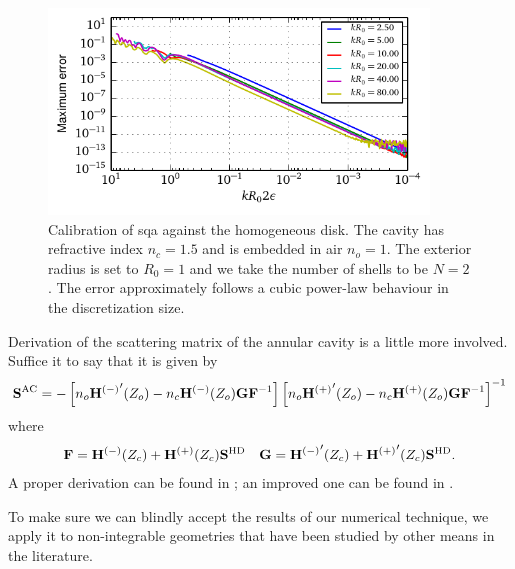 \begin{figure}
 \centering
 \includegraphics[width=0.9\textwidth]{figs/passive/convergenceHomo.pdf}
 \caption[Convergence properties of SQA when applied on the homogeneous disk]
	  {Calibration of \gls{sqa} against the homogeneous disk. The cavity 
	  has refractive index $n_c=1.5$ and is embedded in air $n_o=1$. The exterior
	  radius is set to $R_0=1$ and we take the number of shells to be $N=2$.
	  The error approximately follows a cubic power-law behaviour in the discretization
	  size.}
 \label{fig:passive.numerical.convergenceHomogeneousDisk}
\end{figure}

Derivation of the scattering matrix of the annular cavity is a little
more involved. Suffice it to say that it is given by 
  \begin{equation}
   \mathbf{S}^\text{AC} = -\left[n_o{\mathbf{H}^{(-)}}'(Z_o)-n_c\mathbf{H}^{(-)}(Z_o)\mathbf{GF}^{-1}\right]
			\left[n_o{\mathbf{H}^{(+)}}'(Z_o)-n_c\mathbf{H}^{(+)}(Z_o)\mathbf{GF}^{-1}\right]^{-1}
  \end{equation}
where 
  \begin{align}
   \mathbf{F} &= \mathbf{H}^{(-)}(Z_c)+\mathbf{H}^{(+)}(Z_c)\mathbf{S}^\text{HD} & \mathbf{G} = {\mathbf{H}^{(-)}}'(Z_c)+{\mathbf{H}^{(+)}}'(Z_c)\mathbf{S}^\text{HD}.
  \end{align}
A proper derivation can be found in \cite{HEN2002}; an improved
one can be found in \cite[Appendix D]{GAP2013}.


To make sure we can blindly accept the results of our numerical
technique, we apply it to non-integrable geometries that have been
studied by other means in the literature. 

